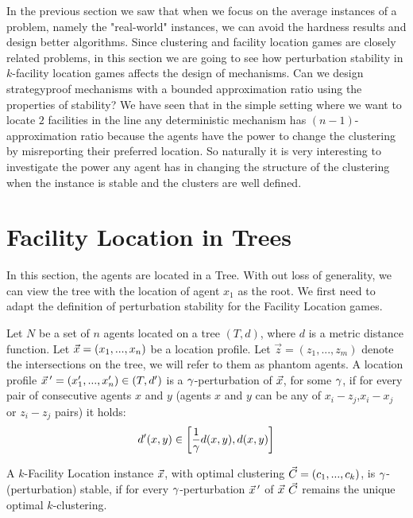 
In the previous section we saw that when we focus on the average instances of a problem, namely the "real-world" instances, we can avoid the hardness results and design better algorithms. Since clustering and facility location games are closely related problems, in this section we are going to see how perturbation stability in $k$-facility location games affects the design of mechanisms. Can we design strategyproof mechanisms with a bounded approximation ratio using the properties of stability? We have seen that in the simple setting where we want to locate $2$ facilities in the line any deterministic mechanism has $(n-1)$-approximation ratio because the agents have the power to change the clustering by misreporting their preferred location. So naturally it is very interesting to investigate the power any agent has in changing the structure of the clustering when the instance is stable and the clusters are well defined.


\section{Facility Location in Trees}


In this section, the agents are located in a Tree. With out loss of generality, we can view the tree with the location of agent $x_1$ as the root. We first need to adapt the definition of perturbation stability for the Facility Location games.

\begin{definition}
Let $N$ be a set of $n$ agents located on a tree $(T,d)$, where $d$ is a metric distance function. Let $\vec{x}=(x_1,...,x_n)$ be a location profile. Let $\vec{z}= (z_1,...,z_m)$ denote the intersections on the tree, we will refer to them as phantom agents. A location profile $\vec{x}\,'=(x_1',...,x_n') \in (T,d')$ is a $\gamma$-perturbation of $\vec{x}$, for some $\gamma$, if for every pair of consecutive agents $x$ and $y$ (agents $x$ and $y$ can be any of $x_i-z_j$,$x_i-x_j$ or $z_i-z_j$ pairs) it holds:
\[ d'(x,y) \in  \bigg[\frac{1}{\gamma}d(x,y),d(x,y) \bigg]\]
 
A $k$-Facility Location instance $\vec{x}$, with optimal clustering $\vec{C}=(c_1,...,c_k)$, is $\gamma$-(perturbation) stable, if for every $\gamma$-perturbation $\vec{x}\,'$ of $\vec{x}$ $\vec{C}$ remains the unique optimal $k$-clustering.
\end{definition}


